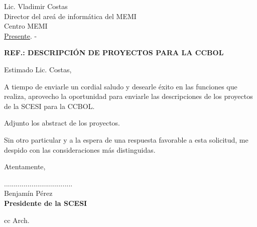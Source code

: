 \documentclass[letterpaper,12pt]{letter}
\begin{document}
\date {11 de octubre de 2011}
\begin{letter}{ Lic. Vladimir Costas \\ Director del are\'a de inform\'atica del MEMI \\ Centro MEMI \\ \underline {Presente}. -}

\begin{center}
	\opening{\textbf{REF.: DESCRIPCI\'ON DE PROYECTOS PARA LA CCBOL}}
\end{center}

Estimado Lic. Costas,

A tiempo de enviarle un cordial saludo y desearle éxito en las funciones que realiza, aprovecho la oportunidad para enviarle las 
descripciones de los proyectos de la SCESI para la CCBOL.

Adjunto los abstract de los proyectos.

Sin otro particular y a la espera de una respuesta favorable a esta solicitud, me despido con las consideraciones más distinguidas.

Atentamente,

\vspace{3.5cm}

\begin{center}
...................................\\
Benjam\'in P\'erez\\
{\bfseries Presidente de la  SCESI}
\end{center}
\vspace{2cm}
cc Arch.
\end{letter}
\end{document}
